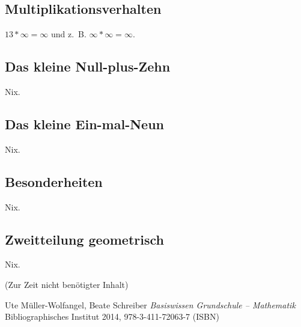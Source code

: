 \documentclass[a4paper]{amsart}
\theoremstyle{definition}
\begin{document}
\subsection{Multiplikationsverhalten}
$13 * \infty = \infty$ und z.~B. $\infty * \infty = \infty$.

\subsection{Das kleine Null-plus-Zehn}
Nix.

\subsection{Das kleine Ein-mal-Neun}
Nix.

\subsection{Besonderheiten}
Nix.

\subsection{Zweitteilung geometrisch}
Nix.

\begin{backup}
   (Zur Zeit nicht benötigter Inhalt)
\end{backup}

\begin{thebibliography}{9}
      Ute Müller-Wolfangel, Beate Schreiber \emph{Basiswissen Grundschule – Mathematik}
      Bibliographisches Institut 2014, 978-3-411-72063-7 (ISBN)

\end{thebibliography}
\end{document}
